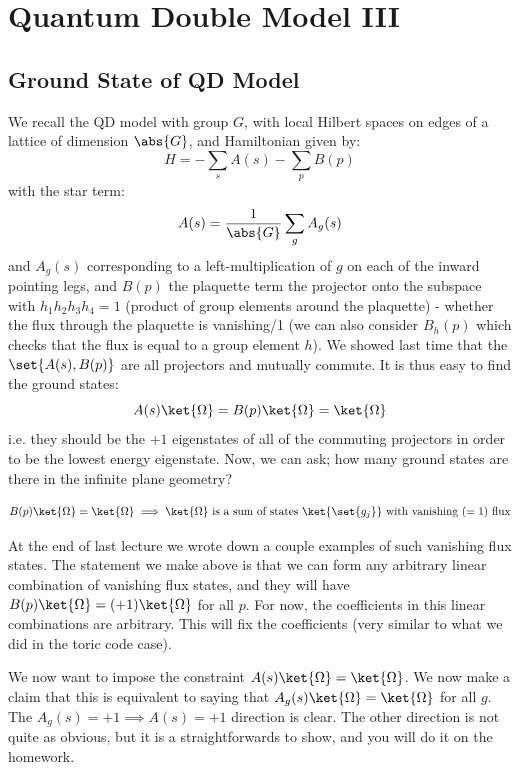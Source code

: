 \section{Quantum Double Model III}
\subsection{Ground State of QD Model}
We recall the QD model with group $G$, with local Hilbert spaces on edges of a lattice of dimension $\abs{G}$, and Hamiltonian given by:
\begin{equation}
    H = -\sum_s A(s) - \sum_p B(p)
\end{equation}
with the star term:
\begin{equation}
    A(s) = \frac{1}{\abs{G}}\sum_g A_g(s)
\end{equation}
and $A_g(s)$ corresponding to a left-multiplication of $g$ on each of the inward pointing legs, and $B(p)$ the plaquette term the projector onto the subspace with $h_1h_2h_3h_4 = 1$ (product of group elements around the plaquette) - whether the flux through the plaquette is vanishing/1 (we can also consider $B_h(p)$ which checks that the flux is equal to a group element $h$). We showed last time that the $\set{A(s), B(p)}$ are all projectors and mutually commute. It is thus easy to find the ground states:
\begin{equation}
    A(s)\ket{\Omega} = B(p)\ket{\Omega} = \ket{\Omega}
\end{equation}
i.e. they should be the $+1$ eigenstates of all of the commuting projectors in order to be the lowest energy eigenstate. Now, we can ask; how many ground states are there in the infinite plane geometry?

\begin{equation}
    B(p)\ket{\Omega} = \ket{\Omega} \implies \ket{\Omega} \text{ is a sum of states $\ket{\set{g_j}}$ with vanishing ($=1$) flux}
\end{equation}

At the end of last lecture we wrote down a couple examples of such vanishing flux states. The statement we make above is that we can form any arbitrary linear combination of vanishing flux states, and they will have $B(p)\ket{\Omega} = (+1)\ket{\Omega}$ for all $p$. For now, the coefficients in this linear combinations are arbitrary. This will fix the coefficients (very similar to what we did in the toric code case).

We now want to impose the constraint $A(s)\ket{\Omega} = \ket{\Omega}$. We now make a claim that this is equivalent to saying that $A_g(s)\ket{\Omega} = \ket{\Omega}$ for all $g$. The $A_g(s) = +1 \implies A(s) = +1$ direction is clear. The other direction is not quite as obvious, but it is a straightforwards to show, and you will do it on the homework. 

